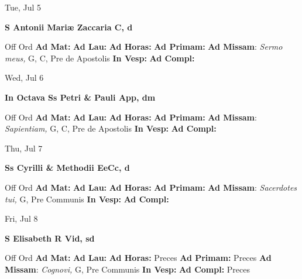 \documentclass[10pt]{article}
\begin{document}
\begin{minipage}{3.5in}
\vspace{2em}\begin{center}
Tue, Jul 5
\end{center}\textbf{ \large S Antonii Mariæ Zaccaria C, \textnormal{\normalsize d}}
\begin{justify}
Off Ord
\textbf{Ad Mat: }
\textbf{Ad Lau: }
\textbf{Ad Horas: }
\textbf{Ad Primam: }
\textbf{Ad Missam}: \textit{Sermo meus,} G, C, Pre de Apostolis
\textbf{In Vesp: }
\textbf{Ad Compl: }\end{justify}
\end{minipage}



\begin{minipage}{3.5in}
\vspace{2em}\begin{center}
Wed, Jul 6
\end{center}\textbf{ \large In Octava Ss Petri \& Pauli App, \textnormal{\normalsize dm}}
\begin{justify}
Off Ord
\textbf{Ad Mat: }
\textbf{Ad Lau: }
\textbf{Ad Horas: }
\textbf{Ad Primam: }
\textbf{Ad Missam}: \textit{Sapientiam,} G, C, Pre de Apostolis
\textbf{In Vesp: }
\textbf{Ad Compl: }\end{justify}
\end{minipage}



\begin{minipage}{3.5in}
\vspace{2em}\begin{center}
Thu, Jul 7
\end{center}\textbf{ \large Ss Cyrilli \& Methodii EeCc, \textnormal{\normalsize d}}
\begin{justify}
Off Ord
\textbf{Ad Mat: }
\textbf{Ad Lau: }
\textbf{Ad Horas: }
\textbf{Ad Primam: }
\textbf{Ad Missam}: \textit{Sacerdotes tui,} G, Pre Communis
\textbf{In Vesp: }
\textbf{Ad Compl: }\end{justify}
\end{minipage}



\begin{minipage}{3.5in}
\vspace{2em}\begin{center}
Fri, Jul 8
\end{center}\textbf{ \large S Elisabeth R Vid, \textnormal{\normalsize sd}}
\begin{justify}
Off Ord
\textbf{Ad Mat: }
\textbf{Ad Lau: }
\textbf{Ad Horas: }Preces
\textbf{Ad Primam: }Preces
\textbf{Ad Missam}: \textit{Cognovi,} G, Pre Communis
\textbf{In Vesp: }
\textbf{Ad Compl: }Preces\end{justify}
\end{minipage}
\end{document}
